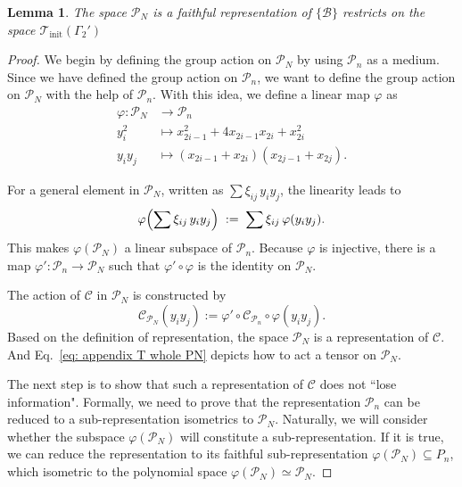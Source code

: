 \documentclass[journal=jctcce,a4paper,manuscript=article]{achemso}
\newtheorem{lemma}{Lemma}
\newcommand{\Tcal}{\mathcal{T}}
\begin{document}
\begin{lemma}
  \label{lemma: reduce Pn to PN}
  The space $\mathcal{P}_N$ is a faithful representation of $\{\mathcal{B}\}$ restricts on the space $\Tcal_\text{init}(\Gamma_2')$
\end{lemma}
\begin{proof}
  We begin by defining the group action on \(\mathcal{P}_N\) by using \(\mathcal{P}_n\) as a medium. Since we have defined the group action on \(\mathcal{P}_n\), we want to define the group action on \(\mathcal{P}_N\) with the help of \(\mathcal{P}_n\). With this idea, we define a linear map $\varphi$ as
  \begin{equation}
    \begin{aligned}
      \varphi : \mathcal{P}_N & \to \mathcal{P}_n                                                  \\
      y_i^2                   & \mapsto x_{2i-1}^2+4 x_{2i-1} x_{2i}+x_{2i}^2                      \\
      y_i y_j                 & \mapsto  \left(x_{2i-1}+x_{2i}\right)\left(x_{2j-1}+x_{2j}\right).
    \end{aligned}
  \end{equation}

  For a general element in \(\mathcal{P}_N\), written as \(\sum \xi_{ij}\,y_i
  y_j\), the linearity leads to
  \[
    \varphi\Bigl(\sum \xi_{ij}\,y_i y_j\Bigr)
    \;:=\;
    \sum \xi_{ij}\,\varphi(y_i y_j).
  \]
  This makes \(\varphi(\mathcal{P}_N)\) a linear subspace of \(\mathcal{P}_n\).
  Because \(\varphi\) is injective, there is a map \(\varphi': \mathcal{P}_n \to
  \mathcal{P}_N\) such that \(\varphi' \circ \varphi\) is the identity on
  \(\mathcal{P}_N\).

  The action of $\mathcal{C}$ in $\mathcal{P}_N$ is constructed by
  \begin{equation}
    \mathcal{C}_{\mathcal{P}_N}(y_i y_j) := \varphi' \circ \mathcal{C}_{\mathcal{P}_n}\circ \varphi(y_i y_j).
    \label{eq: appendix T whole PN}
  \end{equation}
  Based on the definition of representation, the space $\mathcal{P}_N$ is a representation of $\mathcal{C}$. And Eq.~\eqref{eq: appendix T whole PN} depicts how to act a tensor on $\mathcal{P}_N$.

  The next step is to show that such a representation of $\mathcal{C}$ does not
  ``lose information". Formally, we need to prove that the representation
  $\mathcal{P}_n$ can be reduced to a sub-representation isometrics to
  $\mathcal{P}_N$. Naturally, we will consider whether the subspace
  $\varphi(\mathcal{P}_N) $ will constitute a sub-representation. If it is true,
  we can reduce the representation to its faithful sub-representation
  $\varphi(\mathcal{P}_N)\subseteq{P}_n $, which isometric to the polynomial
  space $\varphi(\mathcal{P}_N) \simeq \mathcal{P}_N$.


\end{proof}
\end{document}
